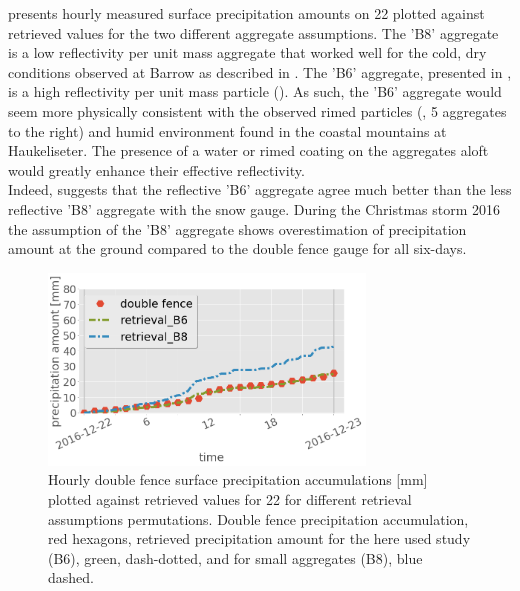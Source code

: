  presents hourly measured surface precipitation amounts on \SI{22}{\dec} plotted against retrieved values for the two different aggregate assumptions. The 'B8' aggregate is a low reflectivity per unit mass aggregate that worked well for the cold, dry conditions observed at Barrow as described in \citet{cooper_variational_2017}. The 'B6' aggregate, presented in , is a high reflectivity per unit mass particle ().  As such, the 'B6' aggregate would seem more physically consistent with the observed rimed particles (, 5 aggregates to the right) and humid environment found in the coastal mountains at Haukeliseter.  The presence of a water or rimed coating on the aggregates aloft would greatly enhance their effective reflectivity. 
\\
Indeed,  suggests that the reflective 'B6' aggregate agree much better than the less reflective 'B8' aggregate with the snow gauge. During the Christmas storm 2016 the assumption of the 'B8' aggregate shows overestimation of precipitation amount at the ground compared to the double fence gauge for all six-days.
%
\\
\begin{figure}[t]
	\centering
	\includegraphics[width=0.75\textwidth]{./fig_obs_ret/20161222_2}
	\caption{Hourly double fence surface precipitation accumulations [mm] plotted against retrieved values for \SI{22}{\dec} for different retrieval assumptions permutations. Double fence precipitation accumulation, red hexagons, retrieved precipitation amount for the here used study (B6), green, dash-dotted, and for small aggregates (B8), blue dashed.}\label{fig:ret_sensitivity}
\end{figure}
